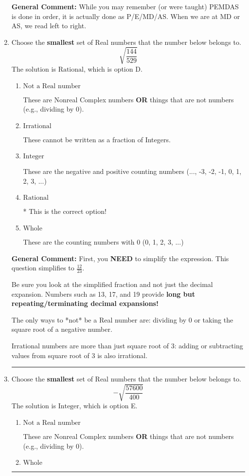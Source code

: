 \documentclass{extbook}[14pt]
\newcommand{\litem}[1]{\item #1

\rule{\textwidth}{0.4pt}}
\begin{document}
\begin{enumerate}
{\textbf{General Comment:} While you may remember (or were taught) PEMDAS is done in order, it is actually done as P/E/MD/AS. When we are at MD or AS, we read left to right.
}
\litem{
Choose the \textbf{smallest} set of Real numbers that the number below belongs to.
\[ \sqrt{\frac{144}{529}} \]The solution is \( \text{Rational} \), which is option D.\begin{enumerate}[label=\Alph*.]
\item \( \text{Not a Real number} \)

These are Nonreal Complex numbers \textbf{OR} things that are not numbers (e.g., dividing by 0).
\item \( \text{Irrational} \)

These cannot be written as a fraction of Integers.
\item \( \text{Integer} \)

These are the negative and positive counting numbers (..., -3, -2, -1, 0, 1, 2, 3, ...)
\item \( \text{Rational} \)

* This is the correct option!
\item \( \text{Whole} \)

These are the counting numbers with 0 (0, 1, 2, 3, ...)
\end{enumerate}

\textbf{General Comment:} First, you \textbf{NEED} to simplify the expression. This question simplifies to $\frac{12}{23}$. 
 
 Be sure you look at the simplified fraction and not just the decimal expansion. Numbers such as 13, 17, and 19 provide \textbf{long but repeating/terminating decimal expansions!} 
 
 The only ways to *not* be a Real number are: dividing by 0 or taking the square root of a negative number. 
 
 Irrational numbers are more than just square root of 3: adding or subtracting values from square root of 3 is also irrational.
}
\litem{
Choose the \textbf{smallest} set of Real numbers that the number below belongs to.
\[ -\sqrt{\frac{57600}{400}} \]The solution is \( \text{Integer} \), which is option E.\begin{enumerate}[label=\Alph*.]
\item \( \text{Not a Real number} \)

These are Nonreal Complex numbers \textbf{OR} things that are not numbers (e.g., dividing by 0).
\item \( \text{Whole} \)


\end{enumerate}}
\end{enumerate}
\end{document}
